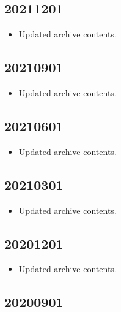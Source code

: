 \documentclass[hidelinks,a4paper,12pt]{article}
\begin{document}
\subsection{20211201}  \label{sec:changelog_20211201}

\begin{itemize}
\item Updated archive contents.
\end{itemize}

\subsection{20210901}  \label{sec:changelog_20210901}

\begin{itemize}
\item Updated archive contents.
\end{itemize}

\subsection{20210601}  \label{sec:changelog_20210601}

\begin{itemize}
\item Updated archive contents.
\end{itemize}

\subsection{20210301}  \label{sec:changelog_20210301}

\begin{itemize}
\item Updated archive contents.
\end{itemize}

\subsection{20201201}  \label{sec:changelog_20201201}

\begin{itemize}
\item Updated archive contents.
\end{itemize}

\subsection{20200901}  \label{sec:changelog_20200901}
\end{document}
